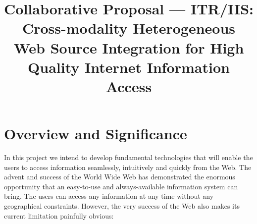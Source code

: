 \title{Collaborative Proposal --- ITR/IIS: Cross-modality Heterogeneous
Web Source Integration for High Quality Internet Information Access}

\newcommand{\MEGA}{\mathsf{MEGA}}
\newcommand{\SVMActive}{\mathsf{SVM}_{\mbox{\scriptsize{\textit{Active}}}}}


\section{Overview and Significance}
\label{sec-overview}

In this project we intend to develop fundamental technologies that 
will enable the users to access information
seamlessly, intuitively and quickly from the Web. 
The advent and success  of the World Wide Web has demonstrated 
the enormous opportunity that an easy-to-use and always-available
information system can bring. The users can access any information
at any time without any geographical constraints.
However, the very success of the Web also makes its current limitation
painfully obvious:

